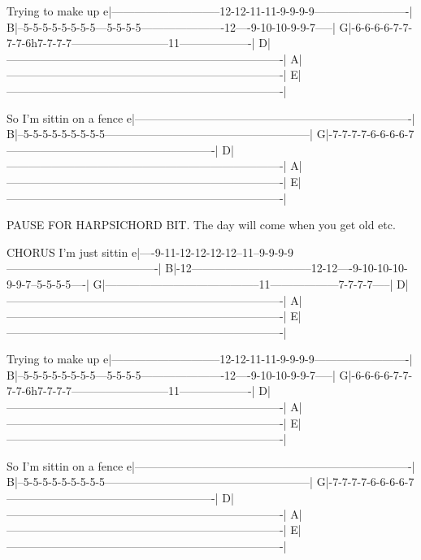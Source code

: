                                Trying to make up
e|-----------------------------12-12-11-11-9-9-9-9-------------------------|
B|--5-5-5-5-5-5-5-5---5-5-5-5----------------------12----9-10-10-9-9-7-----|
G|-6-6-6-6-7-7-7-7-6h7-7-7-7--------------------------11-------------------|
D|-------------------------------------------------------------------------|
A|-------------------------------------------------------------------------|
E|-------------------------------------------------------------------------|

   So I'm sittin on a fence
e|-------------------------------------------------------------------------|
B|--5-5-5-5-5-5-5-5-5------------------------------------------------------|
G|-7-7-7-7-6-6-6-6-7-------------------------------------------------------|
D|-------------------------------------------------------------------------|
A|-------------------------------------------------------------------------|
E|-------------------------------------------------------------------------|

PAUSE FOR HARPSICHORD BIT.  The day will come when you get old etc.


CHORUS
               I'm just sittin
e|----9-11-12-12-12-12--11--9-9-9-9----------------------------------------|
B|-12--------------------------------12-12----9-10-10-10-9-9-7--5-5-5-5----|
G|-----------------------------------------11------------------7-7-7-7-----|
D|-------------------------------------------------------------------------|
A|-------------------------------------------------------------------------|
E|-------------------------------------------------------------------------|

                               Trying to make up
e|-----------------------------12-12-11-11-9-9-9-9-------------------------|
B|--5-5-5-5-5-5-5-5---5-5-5-5----------------------12----9-10-10-9-9-7-----|
G|-6-6-6-6-7-7-7-7-6h7-7-7-7--------------------------11-------------------|
D|-------------------------------------------------------------------------|
A|-------------------------------------------------------------------------|
E|-------------------------------------------------------------------------|

   So I'm sittin on a fence
e|-------------------------------------------------------------------------|
B|--5-5-5-5-5-5-5-5-5------------------------------------------------------|
G|-7-7-7-7-6-6-6-6-7-------------------------------------------------------|
D|-------------------------------------------------------------------------|
A|-------------------------------------------------------------------------|
E|-------------------------------------------------------------------------|


